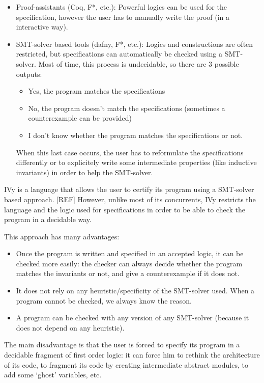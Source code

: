 \documentclass[11pt,a4paper,oldfontcommands]{memoir}
\begin{document}
    \begin{itemize}
        \item Proof-assistants (Coq, F*, etc.):
        Powerful logics can be used for the specification,
        however the user has to manually write the proof (in a interactive way).
        \item SMT-solver based tools (dafny, F*, etc.):
        Logics and constructions are often restricted, but specifications can automatically be checked using a SMT-solver.
        Most of time, this process is undecidable,
        so there are 3 possible outputs:
        \begin{itemize}
            \item Yes, the program matches the specifications
            \item No, the program doesn't match the specifications (sometimes a counterexample can be provided)
            \item I don't know whether the program matches the specifications or not.
        \end{itemize}
        When this last case occurs, the user has to reformulate the specifications differently or to explicitely write some intermediate properties (like inductive invariants)
        in order to help the SMT-solver.
    \end{itemize}

    IVy is a language that allows the user to certify its program using a SMT-solver based approach. [REF]
    However, unlike most of its concurrents, IVy restricts the language and the logic used for specifications
    in order to be able to check the program in a decidable way.

    This approach has many advantages:
    \begin{itemize}
        \item Once the program is written and specified in an accepted logic, it can be checked more easily:
        the checker can always decide whether the program matches the invariants or not, and give a counterexample if it does not.
        \item It does not rely on any heuristic/specificity of the SMT-solver used.
        When a program cannot be checked, we always know the reason.
        \item A program can be checked with any version of any SMT-solver (because it does not depend on any heuristic).
    \end{itemize}
    
    The main disadvantage is that the user is forced to specify its program in a decidable fragment of first order logic:
    it can force him to rethink the architecture of its code, to fragment its code by creating intermediate abstract modules,
    to add some `ghost' variables, etc.
\end{document}

